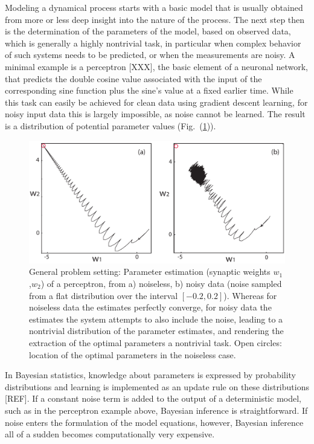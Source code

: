 \documentclass[11pt]{article}
\theoremstyle{definition}
\begin{document}
Modeling a dynamical process starts with a basic model that is usually obtained from more or less deep insight into the nature of the process. The next step then is the determination of the parameters of the model, based on observed data, which is generally a highly nontrivial task, in particular when complex behavior of such systems needs to be predicted, or when the measurements are noisy.
A minimal example is a perceptron [XXX], the basic element of a neuronal network, that predicts the double cosine value associated with the input of the corresponding sine function plus the sine's value at a fixed earlier time. While this task can easily be achieved for clean data using gradient descent learning, for noisy input data this is largely impossible, as noise cannot be learned. The result is a distribution of potential parameter values (Fig.~(\ref{neural})).
\begin{figure}[h]
    \centering
    \includegraphics[width=1.0\textwidth]{neuron.pdf}
    \caption{General problem setting: Parameter estimation (synaptic weights $w_1$,$w_2$) of a perceptron, from a) noiseless, b) noisy data (noise sampled from a flat distribution over the  interval $[-0.2,0.2]$). Whereas for noiseless data the estimates perfectly converge, for noisy data the estimates  the system attempts to also include the noise, leading to a nontrivial distribution of the parameter estimates, and rendering the extraction of the optimal parameters a nontrivial task. Open circles: location of the optimal parameters in the noiseless case.}
    \label{neural}
\end{figure}

In Bayesian statistics, knowledge about parameters is expressed by probability distributions and learning is implemented as an update rule on these distributions [REF].
If a constant noise term is added to the output of a deterministic model, such as in the perceptron example above, Bayesian inference is straightforward.
If noise enters the formulation of the model equations, however, Bayesian inference all of a sudden becomes computationally very expensive.
\end{document}
